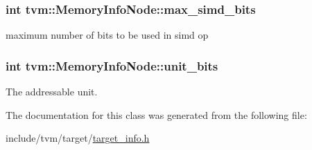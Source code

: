 \subsubsection[{\texorpdfstring{max\+\_\+simd\+\_\+bits}{max_simd_bits}}]{\setlength{\rightskip}{0pt plus 5cm}int tvm\+::\+Memory\+Info\+Node\+::max\+\_\+simd\+\_\+bits}\hypertarget{classtvm_1_1MemoryInfoNode_aededa36e61d4f423bd363519d8d17809}{}\label{classtvm_1_1MemoryInfoNode_aededa36e61d4f423bd363519d8d17809}


maximum number of bits to be used in simd op 

\subsubsection[{\texorpdfstring{unit\+\_\+bits}{unit_bits}}]{\setlength{\rightskip}{0pt plus 5cm}int tvm\+::\+Memory\+Info\+Node\+::unit\+\_\+bits}\hypertarget{classtvm_1_1MemoryInfoNode_aa935f1ee9d8d2f06633ca4b3c44f7725}{}\label{classtvm_1_1MemoryInfoNode_aa935f1ee9d8d2f06633ca4b3c44f7725}


The addressable unit. 



The documentation for this class was generated from the following file\+:\begin{DoxyCompactItemize}
\item 
include/tvm/target/\hyperlink{target__info_8h}{target\+\_\+info.\+h}\end{DoxyCompactItemize}
